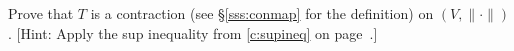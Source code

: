 \begin{Exercise}\label{ex:tmodb}
    Prove that $T$ is a contraction (see \S\ref{sss:conmap} for the definition) on $(V, \| \cdot \|)$.
    [Hint: Apply the sup inequality from \cref{c:supineq} on page~\pageref{c:supineq}.]
\end{Exercise}
